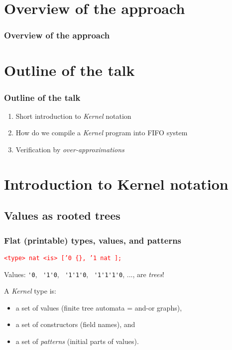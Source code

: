 \documentclass[utf8]{beamer}
\newcommand{\Kernel}{\textit{Kernel}}
\newcommand{\mypause}{\pause}
\begin{document}
\section{Overview of the approach}

\begin{frame} 
  \frametitle{Overview of the approach}
  \begin{center}
    
  \end{center}
\end{frame}

\section{Outline of the talk}

\begin{frame} 
  \frametitle{Outline of the talk}
  \begin{enumerate}
  \item Short introduction to \Kernel{} notation
  \item How do we compile a \Kernel{} program into FIFO system 
  \item Verification by \emph{over-approximations} 
  \end{enumerate}

  \hfill 
\end{frame}

\section{Introduction to Kernel notation}

\subsection{Values as rooted trees}
\begin{frame}[fragile]
  \frametitle{Flat (printable) types, values, and patterns}
    \textcolor{red}{\texttt{<type> nat <is> ['0 \{\}, '1 nat ];}}
  \begin{center}
          
  \end{center} \mypause 
{\footnotesize Values: \verb+'0+,~ \verb+'1'0+,~
  \verb+'1'1'0+,~ \verb+'1'1'1'0+, ...\mypause, are \emph{trees}!}\\[0.4cm]

  \mypause 

  A \Kernel{} type is:
  \begin{itemize}
  \item a set of values (finite tree automata = and-or graphs),
  \item a set of constructors (field names), and
  \item a set of \emph{patterns} (initial parts of values).
  \end{itemize}
\end{frame}
\end{document}
